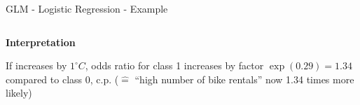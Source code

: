 \documentclass[10pt,compress,t,notes=noshow, xcolor=table]{beamer}
\begin{document}
\begin{framev}[align=top]{GLM - Logistic Regression - Example}
{\begin{scriptsize}
\begin{tabular}{rrrr}
\hline
\end{tabular}
\end{scriptsize}
\pause
\spacer[0]
}{
\spacer[0]
{}
\spacer[0]
}
\spacer[0.25]
\textbf{Interpretation}
\begin{itemizeM}
\item If  increases by $1^\circ C$, odds ratio for class 1 increases by factor $\exp(0.29) = 1.34$ compared to class 0, c.p. ($\hat{=}$ ``high number of bike rentals'' now 1.34 times more likely)
\end{itemizeM}
\end{framev}









\end{document}

